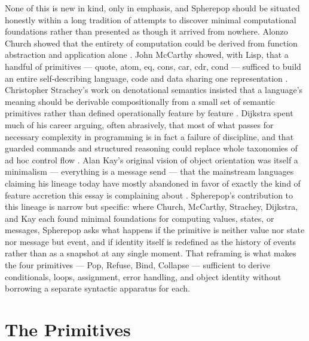 \documentclass[11pt]{article}
\begin{document}
None of this is new in kind, only in emphasis, and Spherepop should be situated honestly within a long tradition of attempts to discover minimal computational foundations rather than presented as though it arrived from nowhere. Alonzo Church showed that the entirety of computation could be derived from function abstraction and application alone \cite{church1936}. John McCarthy showed, with Lisp, that a handful of primitives --- quote, atom, eq, cons, car, cdr, cond --- sufficed to build an entire self-describing language, code and data sharing one representation \cite{mccarthy1960}. Christopher Strachey's work on denotational semantics insisted that a language's meaning should be derivable compositionally from a small set of semantic primitives rather than defined operationally feature by feature \cite{strachey2000}. Dijkstra spent much of his career arguing, often abrasively, that most of what passes for necessary complexity in programming is in fact a failure of discipline, and that guarded commands and structured reasoning could replace whole taxonomies of ad hoc control flow \cite{dijkstra1975}. Alan Kay's original vision of object orientation was itself a minimalism --- everything is a message send --- that the mainstream languages claiming his lineage today have mostly abandoned in favor of exactly the kind of feature accretion this essay is complaining about \cite{kay1993}. Spherepop's contribution to this lineage is narrow but specific: where Church, McCarthy, Strachey, Dijkstra, and Kay each found minimal foundations for computing values, states, or messages, Spherepop asks what happens if the primitive is neither value nor state nor message but event, and if identity itself is redefined as the history of events rather than as a snapshot at any single moment. That reframing is what makes the four primitives --- Pop, Refuse, Bind, Collapse --- sufficient to derive conditionals, loops, assignment, error handling, and object identity without borrowing a separate syntactic apparatus for each.

\section{The Primitives}
\end{document}

